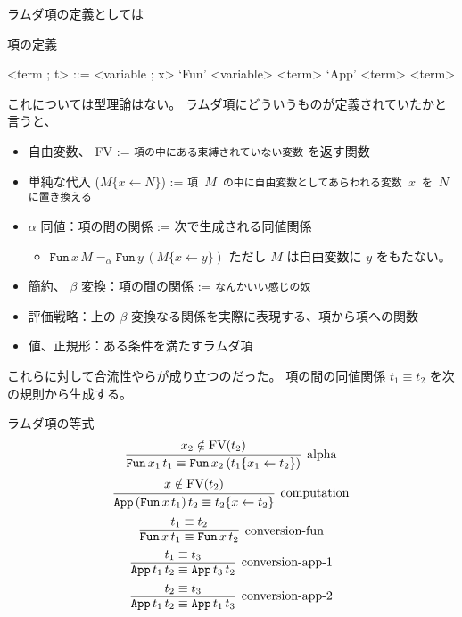 ラムダ項の定義としては
\begin{itembox}[l]{項の定義}
  \begin{grammar}
    <term ; t> ::= <variable ; x>
    \alt `Fun' <variable> <term>
    \alt `App' <term> <term>
  \end{grammar}
\end{itembox}

これについては型理論はない。
ラムダ項にどういうものが定義されていたかと言うと、

\begin{itemize}
  \item 自由変数、 FV := \texttt{項の中にある束縛されていない変数} を返す関数
  \item 単純な代入 (\(M\{x \leftarrow N\}\)) := \texttt{項 \(M\) の中に自由変数としてあらわれる変数 \(x\) を \(N\) に置き換える}
  \item \(\alpha\) 同値：項の間の関係 := 次で生成される同値関係
    \begin{itemize}
      \item \(\texttt{Fun} \, x \, M =_{\alpha} \texttt{Fun} \, y \, (M \{x \leftarrow y\})\) ただし \(M\) は自由変数に \(y\) をもたない。
    \end{itemize}
  \item 簡約、 \(\beta\) 変換：項の間の関係 := \texttt{なんかいい感じの奴}
  \item 評価戦略：上の \(\beta\) 変換なる関係を実際に表現する、項から項への関数
  \item 値、正規形：ある条件を満たすラムダ項
\end{itemize}

これらに対して合流性やらが成り立つのだった。
項の間の同値関係 \(t_1 \equiv t_2\) を次の規則から生成する。

\begin{itembox}[l]{ラムダ項の等式}
  \[\infer[\text{alpha}]{\texttt{Fun} \, x_1 \, t_1 \equiv \texttt{Fun} \, x_2 \, (t_1\{x_1 \leftarrow t_2\})}{x_2 \notin \text{FV}(t_2)}\]
  \[\infer[\text{computation}]{\texttt{App} \, (\texttt{Fun} \, x \, t_1) \, t_2 \equiv t_2\{x \leftarrow t_2\}}{x \notin \text{FV}(t_2)}\]
  \[\infer[\text{conversion-fun}]{\texttt{Fun} \, x \, t_1 \equiv \texttt{Fun} \, x \, t_2}{t_1 \equiv t_2}\]
  \[\infer[\text{conversion-app-1}]{\texttt{App} \, t_1 \, t_2 \equiv \texttt{App} \, t_3 \, t_2}{t_1 \equiv t_3}\]
  \[\infer[\text{conversion-app-2}]{\texttt{App} \, t_1 \, t_2 \equiv \texttt{App} \, t_1 \, t_3}{t_2 \equiv t_3}\]
\end{itembox}

